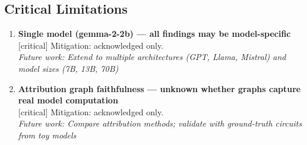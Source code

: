 \documentclass[11pt,a4paper]{article}
\begin{document}
\subsection{Critical Limitations}
\begin{enumerate}[leftmargin=*]
\item \textbf{Single model (gemma-2-2b) — all findings may be model-specific} \\\textcolor{criticalred}{[critical]} Mitigation: acknowledged only. \\\textit{Future work: Extend to multiple architectures (GPT, Llama, Mistral) and model sizes (7B, 13B, 70B)}
\item \textbf{Attribution graph faithfulness — unknown whether graphs capture real model computation} \\\textcolor{criticalred}{[critical]} Mitigation: acknowledged only. \\\textit{Future work: Compare attribution methods; validate with ground-truth circuits from toy models}
\end{enumerate}
\end{document}
